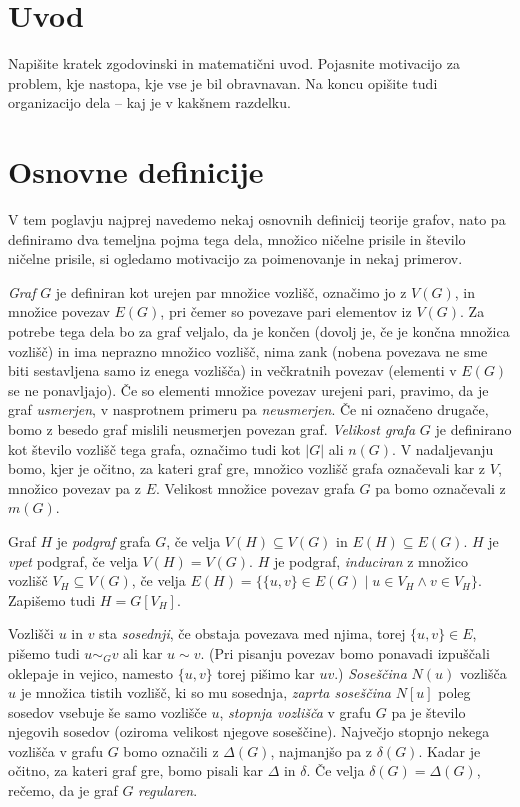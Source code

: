 \documentclass[12pt,a4paper,twoside]{article}
\theoremstyle{definition} %
\theoremstyle{plain} %
\numberwithin{equation}{section}  %
\begin{document}
\section{Uvod}
Napišite kratek zgodovinski in matematični uvod.  Pojasnite motivacijo za problem, kje
nastopa, kje vse je bil obravnavan. Na koncu opišite tudi organizacijo dela -- kaj je v kakšnem
razdelku.

\section{Osnovne definicije}
V tem poglavju najprej navedemo nekaj osnovnih definicij teorije grafov, nato pa definiramo dva temeljna pojma tega dela, množico ničelne prisile in število ničelne prisile, si ogledamo motivacijo za poimenovanje in nekaj primerov.

\emph{Graf} $G$ je definiran kot urejen par množice vozlišč, označimo jo z $V(G)$, in množice povezav $E(G)$, pri čemer so povezave pari elementov iz $V(G)$. Za potrebe tega dela bo za graf veljalo, da je končen (dovolj je, če je končna množica vozlišč) in ima neprazno množico vozlišč, nima zank (nobena povezava ne sme biti sestavljena samo iz enega vozlišča) in večkratnih povezav (elementi v $E(G)$ se ne ponavljajo). Če so elementi množice povezav urejeni pari, pravimo, da je graf \emph{usmerjen}, v nasprotnem primeru pa \emph{neusmerjen}. Če ni označeno drugače, bomo z besedo graf mislili neusmerjen povezan graf. \emph{Velikost grafa} $G$ je definirano kot število vozlišč tega grafa, označimo tudi kot $|G|$ ali $n(G)$. V nadaljevanju bomo, kjer je očitno, za kateri graf gre, množico vozlišč grafa označevali kar z $V$, množico povezav pa z $E$. Velikost množice povezav grafa $G$ pa bomo označevali z $m(G)$.

Graf $H$ je \emph{podgraf} grafa $G$, če velja $V(H) \subseteq V(G)$ in $E(H) \subseteq E(G)$. $H$ je \emph{vpet} podgraf, če velja $V(H) = V(G)$. $H$ je podgraf, \emph{induciran} z množico vozlišč $V_H \subseteq V(G)$, če velja $E(H) = \{ \{ u,v \} \in E(G) \mid u \in V_H \land v \in V_H \}$. Zapišemo tudi $H = G[V_H]$.

Vozlišči $u$ in $v$ sta \emph{sosednji}, če obstaja povezava med njima, torej $\{u,v\} \in E$, pišemo tudi $u \sim_G v$ ali kar $u \sim v$. (Pri pisanju povezav bomo ponavadi izpuščali oklepaje in vejico, namesto $\{u,v\}$ torej pišimo kar $uv$.) \emph{Soseščina} $N(u)$ vozlišča $u$ je množica tistih vozlišč, ki so mu sosednja, \emph{zaprta soseščina} $N[u]$ poleg sosedov vsebuje še samo vozlišče $u$, \emph{stopnja vozlišča} v grafu $G$ pa je število njegovih sosedov (oziroma velikost njegove soseščine). Največjo stopnjo nekega vozlišča v grafu $G$ bomo označili z $\Delta(G)$, najmanjšo pa z $\delta(G)$. Kadar je očitno, za kateri graf gre, bomo pisali kar $\Delta$ in $\delta$. Če velja $\delta(G) = \Delta(G)$, rečemo, da je graf $G$ \emph{regularen}.
\end{document}
